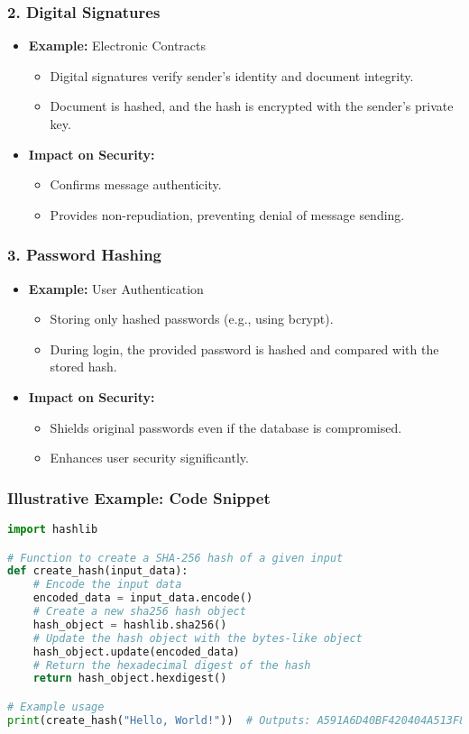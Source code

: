 \documentclass{beamer}
\begin{document}
\begin{frame}
    \frametitle{2. Digital Signatures}
    \begin{itemize}
        \item \textbf{Example:} Electronic Contracts
        \begin{itemize}
            \item Digital signatures verify sender's identity and document integrity.
            \item Document is hashed, and the hash is encrypted with the sender's private key.
        \end{itemize}
        \item \textbf{Impact on Security:} 
        \begin{itemize}
            \item Confirms message authenticity.
            \item Provides non-repudiation, preventing denial of message sending.
        \end{itemize}
    \end{itemize}
\end{frame}

\begin{frame}
    \frametitle{3. Password Hashing}
    \begin{itemize}
        \item \textbf{Example:} User Authentication
        \begin{itemize}
            \item Storing only hashed passwords (e.g., using bcrypt).
            \item During login, the provided password is hashed and compared with the stored hash.
        \end{itemize}
        \item \textbf{Impact on Security:}
        \begin{itemize}
            \item Shields original passwords even if the database is compromised.
            \item Enhances user security significantly.
        \end{itemize}
    \end{itemize}
\end{frame}

\begin{frame}[fragile]
    \frametitle{Illustrative Example: Code Snippet}
    \begin{lstlisting}[language=Python]
import hashlib

# Function to create a SHA-256 hash of a given input
def create_hash(input_data):
    # Encode the input data
    encoded_data = input_data.encode()
    # Create a new sha256 hash object
    hash_object = hashlib.sha256()
    # Update the hash object with the bytes-like object
    hash_object.update(encoded_data)
    # Return the hexadecimal digest of the hash
    return hash_object.hexdigest()

# Example usage
print(create_hash("Hello, World!"))  # Outputs: A591A6D40BF420404A513F898CAC38B99151B8D3
    \end{lstlisting}
\end{frame}
\end{document}
